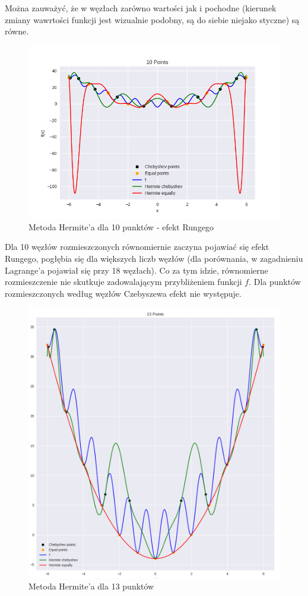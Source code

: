 \documentclass{article}
\begin{document}
Można zauważyć, że w węzłach zarówno wartości jak i pochodne (kierunek zmiany wawrtości funkcji jest wizualnie podobny,
są do siebie niejako styczne) są równe.

\begin{figure}[H]
    \centering
    \includegraphics[width=\textwidth]{img/herm_10.png}
    \caption{Metoda Hermite'a dla 10 punktów - efekt Rungego}
\end{figure}

Dla 10 węzłów rozmieszczonych równomiernie zaczyna pojawiać się efekt Rungego, pogłębia się dla większych liczb węzłów
(dla porównania, w zagadnieniu Lagrange'a pojawiał się przy 18 węzłach).
Co za tym idzie, równomierne rozmieszczenie nie skutkuje zadowalającym przybliżeniem funkcji $f$. 
Dla punktów rozmieszczonych według węzłów Czebyszewa efekt nie występuje.

\begin{figure}[H]
    \centering
    \includegraphics[width=\textwidth]{img/herm_13.png}
    \caption{Metoda Hermite'a dla 13 punktów}
\end{figure}
\end{document}
